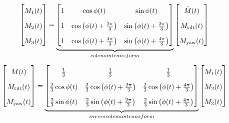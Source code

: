 \begin{gather}
\renewcommand\arraystretch{1.8}  %
 \begin{bmatrix} M_1 (t) \\ M_2(t) \\ M_3(t) \end{bmatrix}
 =
  \underbrace{
  \begin{bmatrix}
   1 &  \cos \phi (t)  &  \sin \phi (t) \\
1    & \cos \left( \phi (t) + \frac{2\pi}{3} \right) & \sin \left( \phi (t) + \frac{2\pi}{3} \right) \\
 1   & \cos \left( \phi (t) + \frac{4\pi}{3} \right) & \sin \left( \phi (t) + \frac{4\pi}{3} \right) \\
   \end{bmatrix}}_{coleman transform}
    \begin{bmatrix} \bar{M} (t) \\ M_{\text{tilt}}(t) \\ M_{\text{yaw}}(t) \end{bmatrix}
\end{gather}
\begin{gather}
\renewcommand\arraystretch{1.8}  %
 \begin{bmatrix} \bar{M} (t) \\ M_{\text{tilt}}(t) \\ M_{\text{yaw}}(t) \end{bmatrix}
 =
  \underbrace{
  \begin{bmatrix}
   \frac{1}{3} & \frac{1}{3} & \frac{1}{3} \\
    \frac{2}{3} \cos \phi (t) & 
    \frac{2}{3} \cos \left( \phi (t) + \frac{2\pi}{3} \right) &
    \frac{2}{3} \cos \left( \phi (t) + \frac{4\pi}{3} \right) \\
    \frac{2}{3} \sin \phi (t) & 
    \frac{2}{3} \sin \left( \phi (t) + \frac{2\pi}{3} \right) &
    \frac{2}{3} \sin \left( \phi (t) + \frac{4\pi}{3} \right) \\
   \end{bmatrix}}_{invers coleman transform}
    \begin{bmatrix} M_1 (t) \\ M_2(t) \\ M_3(t) \end{bmatrix}
\end{gather}


